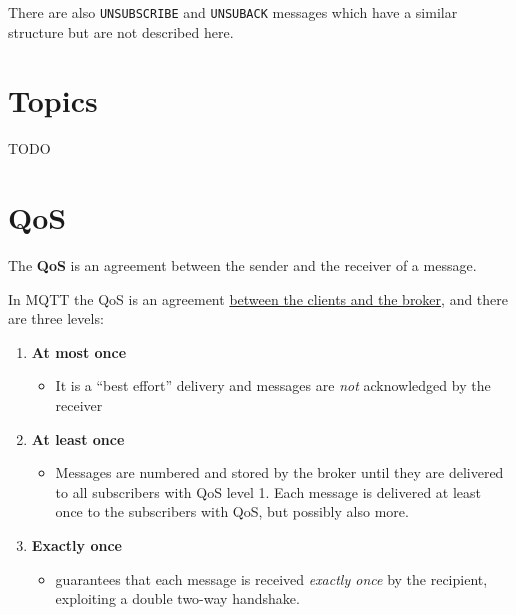 
There are also \texttt{UNSUBSCRIBE} and \texttt{UNSUBACK} messages which have a similar structure but are not described here.

\section{Topics}
TODO

\section{QoS}
The \textbf{QoS} is an agreement between the sender and the
receiver of a message.

In MQTT the QoS is an agreement \ul{between the clients and the broker}, and there are three levels:
\begin{enumerate}[label={\texttt{level \arabic*}},start=0]
   \item \textbf{At most once}
   \begin{itemize}
      \item It is a ``best effort'' delivery and messages are \textit{not} acknowledged by the receiver
   \end{itemize}
   \item \textbf{At least once}
   \begin{itemize}
      \item Messages are numbered and stored by the broker until
      they are delivered to all subscribers with QoS level 1. Each message is delivered at least once to the subscribers with QoS, but possibly also more. 
   \end{itemize}
   \item \textbf{Exactly once}
   \begin{itemize}
      \item  guarantees that each message is received \textit{exactly once} by the recipient, exploiting a double two-way handshake.
   \end{itemize}
\end{enumerate}

